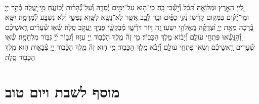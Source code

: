 \documentclass[twoside, openany, parskip=half, 11pt]{book}
\begin{document}
\begin{sometimes}

\\
%
לַ֭יְיָ הָאָ֣רֶץ וּמְלוֹאָ֑הּ תֵּ֝בֵ֗ל וְ֯י֣שְׁ֯בֵי בָֽהּ׃
כִּי־ה֖וּא עַל־יַמִּ֣ים יְ֯סָדָ֑הּ וְ֯עַל־נְ֝֯הָר֗וֹת יְ֯כֽוֹנֲנֶֽהָ׃
מִ֥י ֖יַֽעֲלֶה בְּ֯הַ֣ר יְיָ֑ וּמִ֥י־יָ֝ק֗וּם בִּמְק֥וֹם קָדְ֯שֽׁוֹ׃
נְ֯קִ֥י כַפַּ֗יִם וּבַ֢ר לֵ֫בָ֥ב אֲשֶׁ֤ר לֹֽא־נָשָׂ֣א לַשָּׁ֣וְא נַפְשִׁ֑י וְ֯לֹ֖א נִשְׁבַּ֣ע לְ֯מִרְמָֽה׃
יִשָּׂ֣א בְ֭֯רָכָה מֵאֵ֣ת יְיָ֑ וּ֝צְדָקָ֗ה מֵֽאֱלֹהֵ֥י יִשְׁעֽוֹ׃
זֶ֭ה דּ֣וֹר דֹּרְ֯שָׁ֑ו מְ֯בַקְשֵׁ֥֨י פָנֶי֖ךָ יַֽעֲקֹ֣ב סֶֽלָה׃
שְׂ֯א֤וּ שְׁ֯עָרִ֨ים רָֽאשֵׁיכֶ֗ם וְ֭֯הִנָּֽשְׂ֯אוּ פִּתְחֵ֣י עוֹלָ֑ם וְ֝֯יָב֗וֹא מֶ֣לֶךְ הַכָּבֽוֹד׃
מִ֥י זֶה֘ מֶ֤לֶךְ הַכָּ֫ב֥וֹד יְ֖יָ עִזּ֣וּז וְ֯גִבּ֑וֹר יְ֜יָ֗ גִּבּ֥וֹר מִלְחָמָֽה׃
שְׂ֯א֤וּ שְׁ֯עָרִים רָֽאשֵׁיכֶ֗ם וּ֭שְׂאוּ פִּתְחֵ֣י עוֹלָ֑ם וְ֝֯יָבֹ֗א מֶ֣לֶךְ הַכָּבֽוֹד׃
מִ֤י ה֣וּא זֶה֘ מֶ֢לֶךְ הַכָּ֫ב֥וֹד יְיָ֥ צְ֯בָא֑וֹת ה֤וּא מֶ֖לֶךְ הַכָּב֣וֹד סֶֽלָה׃

\end{sometimes}



\etzchaim

\halfkaddish


\vspace{\baselineskip}

\nextpage

\chapter[מוסף לשבת ויו״ט]{ מוסף לשבת ויום טוב }

\amidaopening{\shabbosshuva}{}
\nextpage

\end{document}
